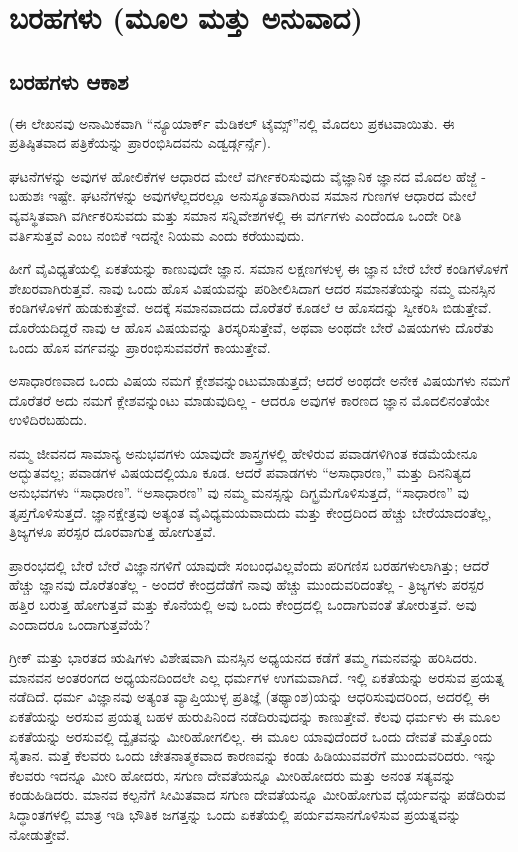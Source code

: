 

\part{ಬರಹಗಳು (ಮೂಲ ಮತ್ತು ಅನುವಾದ)}

\chapter{ಬರಹಗಳು ಆಕಾಶ}

(ಈ ಲೇಖನವು ಅನಾಮಿಕವಾಗಿ “ನ್ಯೂಯಾರ್ಕ್ ಮೆಡಿಕಲ್ ಟೈಮ್ಸ್”ನಲ್ಲಿ ಮೊದಲು ಪ್ರಕಟವಾಯಿತು. ಈ ಪ್ರತಿಷ್ಠಿತವಾದ ಪತ್ರಿಕೆಯನ್ನು ಪ್ರಾರಂಭಿಸಿದವನು ಎಡ್ವರ್ಡ್ಗರ್ನ್ಸೆ).

ಘಟನೆಗಳನ್ನು ಅವುಗಳ ಹೋಲಿಕೆಗಳ ಆಧಾರದ ಮೇಲೆ ವರ್ಗೀಕರಿಸುವುದು ವೈಜ್ಞಾನಿಕ ಜ್ಞಾನದ ಮೊದಲ ಹೆಜ್ಜೆ - ಬಹುಶಃ ಇಷ್ಟೇ. ಘಟನೆಗಳನ್ನು ಅವುಗಳೆಲ್ಲದರಲ್ಲೂ ಅನುಸ್ಯೂತವಾಗಿರುವ ಸಮಾನ ಗುಣಗಳ ಆಧಾರದ ಮೇಲೆ ವ್ಯವಸ್ಥಿತವಾಗಿ ವರ್ಗೀಕರಿಸುವದು ಮತ್ತು ಸಮಾನ ಸನ್ನಿವೇಶಗಳಲ್ಲಿ ಈ ವರ್ಗಗಳು ಎಂದೆಂದೂ ಒಂದೇ ರೀತಿ ವರ್ತಿಸುತ್ತವೆ ಎಂಬ ನಂಬಿಕೆ ಇದನ್ನೇ ನಿಯಮ ಎಂದು ಕರೆಯುವುದು.

ಹೀಗೆ ವೈವಿಧ್ಯತೆಯಲ್ಲಿ ಏಕತೆಯನ್ನು ಕಾಣುವುದೇ ಜ್ಞಾನ. ಸಮಾನ ಲಕ್ಷಣಗಳುಳ್ಳ ಈ ಜ್ಞಾನ ಬೇರೆ ಬೇರೆ ಕಂಡಿಗಳೊಳಗೆ ಶೇಖರವಾಗಿರುತ್ತವೆ. ನಾವು ಒಂದು ಹೊಸ ವಿಷಯವನ್ನು ಪರಿಶೀಲಿಸಿದಾಗ ಆದರ ಸಮಾನತೆಯನ್ನು ನಮ್ಮ ಮನಸ್ಸಿನ ಕಂಡಿಗಳೊಳಗೆ ಹುಡುಕುತ್ತೇವೆ. ಅದಕ್ಕೆ ಸಮಾನವಾದದು ದೊರೆತರೆ ಕೂಡಲೆ ಆ ಹೊಸದನ್ನು ಸ್ವೀಕರಿಸಿ ಬಿಡುತ್ತೇವೆ. ದೊರೆಯದಿದ್ದರೆ ನಾವು ಆ ಹೊಸ ವಿಷಯವನ್ನು ತಿರಸ್ಕರಿಸುತ್ತೇವೆ, ಅಥವಾ ಅಂಥದೇ ಬೇರೆ ವಿಷಯಗಳು ದೊರೆತು ಒಂದು ಹೊಸ ವರ್ಗವನ್ನು ಪ್ರಾರಂಭಿಸುವವರೆಗೆ ಕಾಯುತ್ತೇವೆ.

ಅಸಾಧಾರಣವಾದ ಒಂದು ವಿಷಯ ನಮಗೆ ಕ್ಲೇಶವನ್ನುಂಟುಮಾಡುತ್ತದೆ; ಆದರೆ ಅಂಥದೇ ಅನೇಕ ವಿಷಯಗಳು ನಮಗೆ ದೊರೆತರೆ ಅದು ನಮಗೆ ಕ್ಲೇಶವನ್ನುಂಟು ಮಾಡುವುದಿಲ್ಲ - ಆದರೂ ಅವುಗಳ ಕಾರಣದ ಜ್ಞಾನ ಮೊದಲಿನಂತೆಯೇ ಉಳಿದಿರಬಹುದು.

ನಮ್ಮ ಜೀವನದ ಸಾಮಾನ್ಯ ಅನುಭವಗಳು ಯಾವುದೇ ಶಾಸ್ತ್ರಗಳಲ್ಲಿ ಹೇಳಿರುವ ಪವಾಡಗಳಿಗಿಂತ ಕಡಮೆಯೇನೂ ಅದ್ಭುತವಲ್ಲ; ಪವಾಡಗಳ ವಿಷಯದಲ್ಲಿಯೂ ಕೂಡ. ಆದರೆ ಪವಾಡಗಳು “ಅಸಾಧಾರಣ,” ಮತ್ತು ದಿನನಿತ್ಯದ ಅನುಭವಗಳು “ಸಾಧಾರಣ”. “ಅಸಾಧಾರಣ” ವು ನಮ್ಮ ಮನಸ್ಸನ್ನು ದಿಗ್ಭ್ರಮೆಗೊಳಿಸುತ್ತದೆ, “ಸಾಧಾರಣ” ವು ತೃಪ್ತಗೊಳಿಸುತ್ತದೆ. ಜ್ಞಾನಕ್ಷೇತ್ರವು ಅತ್ಯಂತ ವೈವಿಧ್ಯಮಯವಾದುದು ಮತ್ತು ಕೇಂದ್ರದಿಂದ ಹೆಚ್ಚು ಬೇರೆಯಾದಂತೆಲ್ಲ, ತ್ರಿಜ್ಯಗಳೂ ಪರಸ್ಪರ ದೂರವಾಗುತ್ತ ಹೋಗುತ್ತವೆ.

ಪ್ರಾರಂಭದಲ್ಲಿ ಬೇರೆ ಬೇರೆ ವಿಜ್ಞಾನಗಳಿಗೆ ಯಾವುದೇ ಸಂಬಂಧವಿಲ್ಲವೆಂದು ಪರಿಗಣಿಸ ಬರಹಗಳುಲಾಗಿತ್ತು; ಆದರೆ ಹೆಚ್ಚು ಜ್ಞಾನವು ದೊರೆತಂತೆಲ್ಲ - ಅಂದರೆ ಕೇಂದ್ರದೆಡೆಗೆ ನಾವು ಹೆಚ್ಚು ಮುಂದುವರಿದಂತೆಲ್ಲ - ತ್ರಿಜ್ಯಗಳು ಪರಸ್ಪರ ಹತ್ತಿರ ಬರುತ್ತ ಹೋಗುತ್ತವೆ ಮತ್ತು ಕೊನೆಯಲ್ಲಿ ಅವು ಒಂದು ಕೇಂದ್ರದಲ್ಲಿ ಒಂದಾಗುವಂತೆ ತೋರುತ್ತವೆ. ಅವು ಎಂದಾದರೂ ಒಂದಾಗುತ್ತವೆಯೆ?

ಗ್ರೀಕ್ ಮತ್ತು ಭಾರತದ ಋಷಿಗಳು ವಿಶೇಷವಾಗಿ ಮನಸ್ಸಿನ ಅಧ್ಯಯನದ ಕಡೆಗೆ ತಮ್ಮ ಗಮನವನ್ನು ಹರಿಸಿದರು. ಮಾನವನ ಅಂತರಂಗದ ಅಧ್ಯಯನದಿಂದಲೇ ಎಲ್ಲ ಧರ್ಮಗಳ ಉಗಮವಾಗಿದೆ. ಇಲ್ಲಿ ಏಕತೆಯನ್ನು ಅರಸುವ ಪ್ರಯತ್ನ ನಡೆದಿದೆ. ಧರ್ಮ ವಿಜ್ಞಾನವು ಅತ್ಯಂತ ವ್ಯಾಪ್ತಿಯುಳ್ಳ ಪ್ರತಿಜ್ಞೆ (ತಥ್ಯಾಂಶ)ಯನ್ನು ಆಧರಿಸುವುದರಿಂದ, ಅದರಲ್ಲಿ ಈ ಏಕತೆಯನ್ನು ಅರಸುವ ಪ್ರಯತ್ನ ಬಹಳ ಹುರುಪಿನಿಂದ ನಡೆದಿರುವುದನ್ನು ಕಾಣುತ್ತೇವೆ. ಕೆಲವು ಧರ್ಮಳು ಈ ಮೂಲ ಏಕತೆಯನ್ನು ಅರಸುವಲ್ಲಿ ದ್ವೈತವನ್ನು ಮೀರಿಹೋಗಲಿಲ್ಲ. ಈ ಮೂಲ ಯಾವುದೆಂದರೆ ಒಂದು ದೇವತೆ ಮತ್ತೊಂದು ಸೈತಾನ. ಮತ್ತೆ ಕೆಲವರು ಒಂದು ಚೇತನಾತ್ಮಕವಾದ ಕಾರಣವನ್ನು ಕಂಡು ಹಿಡಿಯುವವರೆಗೆ ಮುಂದುವರಿದರು. ಇನ್ನು ಕೆಲವರು ಇದನ್ನೂ ಮೀರಿ ಹೋದರು, ಸಗುಣ ದೇವತೆಯನ್ನೂ ಮೀರಿಹೋದರು ಮತ್ತು ಅನಂತ ಸತ್ಯವನ್ನು ಕಂಡುಹಿಡಿದರು. ಮಾನವ ಕಲ್ಪನೆಗೆ ಸೀಮಿತವಾದ ಸಗುಣ ದೇವತೆಯನ್ನೂ ಮೀರಿಹೋಗುವ ಧೈರ್ಯವನ್ನು ಪಡೆದಿರುವ ಸಿದ್ಧಾಂತಗಳಲ್ಲಿ ಮಾತ್ರ ಇಡಿ ಭೌತಿಕ ಜಗತ್ತನ್ನು ಒಂದು ಏಕತೆಯಲ್ಲಿ ಪರ್ಯವಸಾನಗೊಳಿಸುವ ಪ್ರಯತ್ನವನ್ನು ನೋಡುತ್ತೇವೆ.

